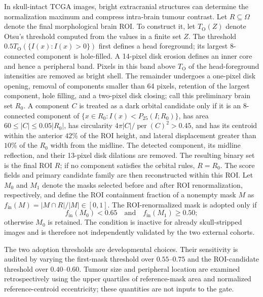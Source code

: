 \documentclass[11pt,a4paper]{article}
\begin{document}
In skull-intact TCGA images, bright extracranial structures can determine the
normalization maximum and compress intra-brain tumour contrast. Let
$R\subseteq\Omega$ denote the final morphological brain ROI. To construct it,
let $T_{\mathrm{O}}(Z)$ denote Otsu's threshold computed from the values in a
finite set $Z$. The threshold $0.5T_{\mathrm{O}}(\{I(x):I(x)>0\})$ first defines a head
foreground; its largest 8-connected component is hole-filled. A 14-pixel disk
erosion defines an inner core and hence a peripheral band. Pixels in this band
above $T_{\mathrm{O}}$ of the head-foreground intensities are removed as bright shell.
The remainder undergoes a one-pixel disk opening, removal of components smaller
than 64 pixels, retention of the largest component, hole filling, and a two-pixel
disk closing; call this preliminary brain set $R_0$. A component $C$ is treated
as a dark orbital candidate only if it is an 8-connected component of
$\{x\in R_0:I(x)<P_{25}(I;R_0)\}$, has area
$60\le |C|\le0.05|R_0|$, has circularity
$4\pi|C|/\operatorname{per}(C)^2>0.45$, and has its centroid
within the anterior $42\%$ of the ROI height, and lateral displacement greater
than $10\%$ of the $R_0$ width from the midline. The detected component, its
midline reflection, and their 13-pixel disk dilations are removed. The resulting
binary set is the final ROI $R$; if no component satisfies the orbital rules,
$R=R_0$.
The score fields and primary candidate family are then reconstructed within this
ROI. Let $M_0$ and $M_1$ denote the masks selected before and after ROI
renormalization, respectively, and define the ROI containment fraction of a
nonempty mask $M$ as $f_{\mathrm{in}}(M)=|M\cap R|/|M|\in[0,1]$. The
ROI-renormalized mask is adopted only if
\begin{equation}
 f_{\mathrm{in}}(M_0)<0.65\quad\text{and}\quad
 f_{\mathrm{in}}(M_1)\ge0.50;
\label{eq:roi-gate-primary}
\end{equation}
otherwise $M_0$ is retained. The condition is inactive for already
skull-stripped images and is therefore not independently validated by the two
external cohorts.

The two adoption thresholds are developmental choices. Their sensitivity is
audited by varying the first-mask threshold over $0.55$--$0.75$ and the
ROI-candidate threshold over $0.40$--$0.60$. Tumour size and peripheral location
are examined retrospectively using the upper quartiles of reference-mask area
and normalized reference-centroid eccentricity; these quantities are not inputs
to the gate.
\end{document}
